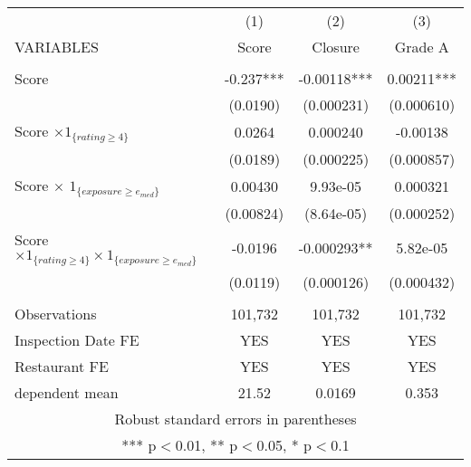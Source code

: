 \begin{tabular}{lccc} \hline
 & (1) & (2) & (3) \\
VARIABLES & Score & Closure & Grade A \\ \hline
 &  &  &  \\
Score & -0.237*** & -0.00118*** & 0.00211*** \\
 & (0.0190) & (0.000231) & (0.000610) \\
Score $\times 1_{\{rating \geq 4\}}$ & 0.0264 & 0.000240 & -0.00138 \\
 & (0.0189) & (0.000225) & (0.000857) \\
Score $\times$ $1_{\{exposure \geq e_{med}\}}$ & 0.00430 & 9.93e-05 & 0.000321 \\
 & (0.00824) & (8.64e-05) & (0.000252) \\
Score $\times 1_{\{rating \geq 4\}} \times 1_{\{exposure \geq e_{med}\}}$ & -0.0196 & -0.000293** & 5.82e-05 \\
 & (0.0119) & (0.000126) & (0.000432) \\
 &  &  &  \\
Observations & 101,732 & 101,732 & 101,732 \\
Inspection Date FE & YES & YES & YES \\
Restaurant FE & YES & YES & YES \\
 dependent mean & 21.52 & 0.0169 & 0.353 \\ \hline
\multicolumn{4}{c}{ Robust standard errors in parentheses} \\
\multicolumn{4}{c}{ *** p$<$0.01, ** p$<$0.05, * p$<$0.1} \\
\end{tabular}
